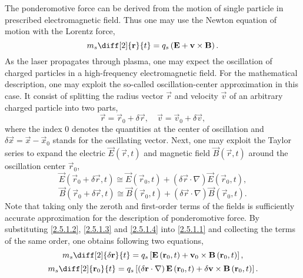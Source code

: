 The ponderomotive force can be derived from the motion of single particle in prescribed electromagnetic field. Thus one may use the Newton equation of motion with the Lorentz force,
\begin{equation}
\label{2.5.1.1}
m_s \diff[2]{\vec{r}}{t} = q_s \left(\vec{E} + \vec{v} \times \vec{B} \right).
\end{equation}
As the laser propagates through plasma, one may expect the oscillation of charged particles in a high-frequency electromagnetic field. For the mathematical description, one may exploit the so-called oscillation-center approximation in this case. It consist of splitting the radius vector $ \vec{r} $ and velocity $ \vec{v} $ of an arbitrary charged particle into two parts,
\begin{equation}
\label{2.5.1.2}
\vec{r} = \vec{r}_0 + \delta \vec{r}, \quad \vec{v} = \vec{v}_0 + \delta \vec{v},
\end{equation}
where the index $ 0 $ denotes the quantities at the center of oscillation and $ \delta \vec{x} = \vec{x} - \vec{x}_0 $ stands for the oscillating vector. Next, one may exploit the Taylor series to  expand the electric $ \vec{E}\left(\vec{r}, t\right) $ and magnetic field $ \vec{B}\left(\vec{r}, t\right) $ around the oscillation center $ \vec{r}_0 $,
\begin{equation}
\label{2.5.1.3}
\vec{E}\left(\vec{r}_0 + \delta \vec{r}, t\right) \cong \vec{E}\left(\vec{r}_0, t\right) + \left(\delta \vec{r} \cdot \nabla \right) \vec{E}\left(\vec{r}_0, t\right),
\end{equation}
\begin{equation}
\label{2.5.1.4}
\vec{B}\left(\vec{r}_0 + \delta \vec{r}, t\right) \cong \vec{B}\left(\vec{r}_0, t\right) + \left(\delta \vec{r} \cdot \nabla \right) \vec{B}\left(\vec{r}_0, t\right).
\end{equation}
Note that taking only the zeroth and first-order terms of the fields is sufficiently accurate approximation for the description of ponderomotive force. By substituting \ref{2.5.1.2}, \ref{2.5.1.3} and \ref{2.5.1.4} into \ref{2.5.1.1} and collecting the terms of the same order, one obtains following two equations, 
\begin{equation}
\label{2.5.1.5}
m_s \diff[2]{\delta \vec{r}}{t} = q_s \left[ \vec{E}\left(\vec{r}_0, t\right) + \vec{v}_0 \times \vec{B}\left(\vec{r}_0, t\right)\right],
\end{equation}
\begin{equation}
\label{2.5.1.6}
m_s \diff[2]{\vec{r}_0}{t} = q_s \left[\left(\delta \vec{r} \cdot \nabla \right) \vec{E}\left(\vec{r}_0, t\right) + \delta \vec{v} \times \vec{B}\left(\vec{r}_0, t\right) \right]. 
\end{equation}

